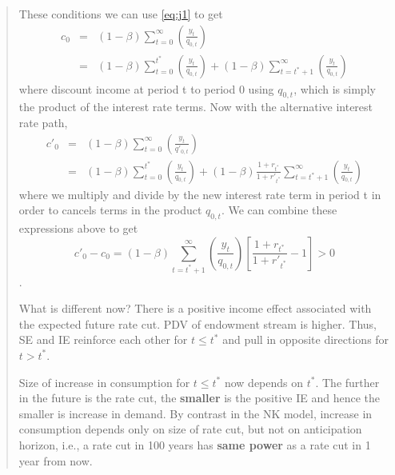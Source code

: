 \begin{exercise}
\begin{quote}
\begin{enumerate}
These conditions we can use \eqref{eq:j1} to get
\begin{eqnarray*}
\label{eq:c_0_endowment}
c_0 &=& 
 (1-\beta)   \sum_{t=0}^{\infty} 
\left(\frac{y_{t}}{q_{0,t}} \right)
\\&=& 
 (1-\beta)   \sum_{t=0}^{t^*} 
\left(\frac{y_{t}}{q_{0,t}} \right)
+ (1-\beta)   \sum_{t=t^*+1}^{\infty} 
\left(\frac{y_{t}}{q_{0,t}} \right)
\end{eqnarray*}
where discount income at period t to period 0 using $q_{0,t}$, which is simply the product of the interest rate terms. Now with the alternative interest rate path,
\begin{eqnarray*}
\label{eq:c'_0_endowment}
c'_0 &=&  (1-\beta)  \sum_{t=0}^{\infty} 
\left(
\frac{y_{t} }
{q'_{0,t}} 
\right)\\
&=& 
 (1-\beta)   \sum_{t=0}^{t^*} 
\left(\frac{y_{t}}{q_{0,t}} \right)
+ (1-\beta) \frac{1+r_{t^*}}{1+r'_{t^*}}
  \sum_{t=t^*+1}^{\infty} 
\left(\frac{y_{t}}{q_{0,t}} \right)
\end{eqnarray*}
where we multiply and divide by the new interest rate term in period t in order to cancels terms in the product $q_{0,t}$. We can combine these expressions above to get
\[
c'_0 - c_0 = (1-\beta)  \sum_{t=t^*+1}^{\infty} 
\left(\frac{y_{t}}{q_{0,t}} \right) \left[\frac{1+r_{t^*}}{1+r'_{t^*}} -1\right]
>0\].

What is different now? There is a positive income effect associated with the expected future rate cut. PDV of endowment stream is higher. Thus, SE and IE reinforce each other for $t\le t^*$ and pull in opposite directions for $t>t^*$. 

Size of increase in consumption for $t \le t^*$ now depends on $t^*$. The further in the future is the rate cut, the {\bf smaller} is the positive IE and hence the smaller is increase in demand. By contrast in the NK model, increase in consumption depends only on size of rate cut, but not on anticipation horizon, i.e., a rate cut in 100 years has {\bf same power} as a rate cut in 1 year from now.

\end{enumerate}
\end{quote}
\end{exercise}